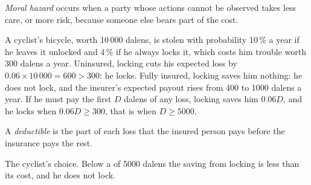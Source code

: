 \begin{definition}\label{def:g11:asymmetric-information:moral-hazard}
\emph{Moral hazard} occurs when a party whose actions cannot be observed takes less care, or more risk, because someone else bears part of the cost.
\end{definition}

\begin{example}\label{ex:g11:asymmetric-information:care}
A cyclist's bicycle, worth 10\,000 dalens, is stolen with probability 10\,\% a year if he leaves it unlocked and 4\,\% if he always locks it, which costs him trouble worth
300 dalens a year. Uninsured, locking cuts his expected loss by $0.06 \times 10\,000 = 600 > 300$: he locks. Fully insured, locking saves him nothing: he does not lock,
and the insurer's expected payout rises from 400 to 1000 dalens a year. If he must pay the first $D$ dalens of any loss, locking saves him $0.06D$, and he locks when
$0.06D \ge 300$, that is when $D \ge 5000$.
\end{example}

\begin{definition}[Deductible]\label{def:g11:asymmetric-information:deductible}
A \emph{deductible} is the part of each loss that the insured person pays before the insurance pays the rest.
\end{definition}

\begin{omfigure}

{\small The cyclist's choice. Below a  of 5000 dalens the saving from locking is less than its cost, and he does not lock.}
\end{omfigure}


